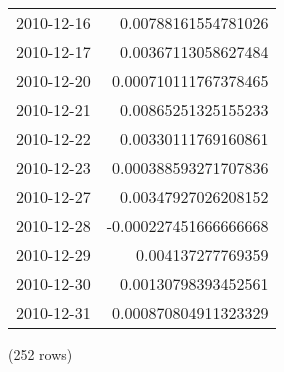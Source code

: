 \begin{tabular}{l | r}
2010-12-16 & 0.00788161554781026 \\
2010-12-17 & 0.00367113058627484 \\
2010-12-20 & 0.000710111767378465 \\
2010-12-21 & 0.00865251325155233 \\
2010-12-22 & 0.00330111769160861 \\
2010-12-23 & 0.000388593271707836 \\
2010-12-27 & 0.00347927026208152 \\
2010-12-28 & -0.000227451666666668 \\
2010-12-29 & 0.004137277769359 \\
2010-12-30 & 0.00130798393452561 \\
2010-12-31 & 0.000870804911323329 \\
\end{tabular}

\noindent (252 rows) \\

